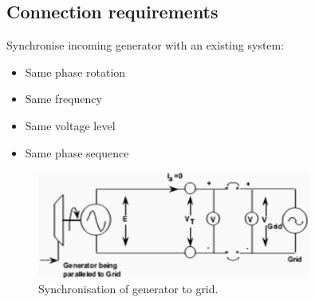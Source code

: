\subsection{Connection requirements}
Synchronise incoming generator with an existing system:
\begin{itemize}
    \item Same phase rotation
    \item Same frequency
    \item Same voltage level
    \item Same phase sequence
\end{itemize}
\begin{figure}[H]
    \centering
    \includegraphics[width = 0.8\textwidth]{img/figure80.png}
    \caption{Synchronisation of generator to grid.}
\end{figure}
